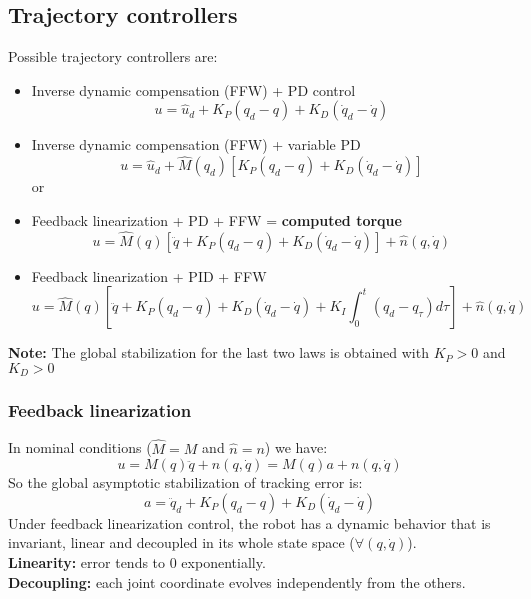 \documentclass[a4paper,12pt]{article}
\begin{document}
\subsection{Trajectory controllers}
Possible trajectory controllers are:
\begin{itemize}
    \item Inverse dynamic compensation (FFW) + PD control 
    \begin{equation}
        u = \hat{u}_d+ K_P(q_d-q)+K_D(\dot{q}_d-\dot{q})
    \end{equation}

    \item Inverse dynamic compensation (FFW) + variable PD
    \begin{equation}
        u = \hat{u}_d+ \hat{M}(q_d)[K_P(q_d-q)+K_D(\dot{q}_d-\dot{q})]
    \end{equation}
    or
    \item Feedback linearization + PD + FFW = \textbf{computed torque}
    \begin{equation}
        u = \hat{M}(q)[\ddot{q}+K_P(q_d-q)+K_D(\dot{q}_d-\dot{q})] + \hat{n}(q,\dot{q})
    \end{equation}

    \item Feedback linearization + PID + FFW
    \begin{equation}
        u = \hat{M}(q)[\ddot{q}+K_P(q_d-q)+K_D(\dot{q}_d-\dot{q})+K_I\int_0^t(q_d-q_\tau)d\tau] + \hat{n}(q,\dot{q})
    \end{equation}
\end{itemize}
\textbf{Note:} The global stabilization for the last two laws is obtained with
$K_P > 0$ and $K_D > 0 $

\subsubsection{Feedback linearization}
In nominal conditions ($\hat{M}=M$ and $\hat{n}=n$) we have:
\begin{equation}
    u = M(q)\ddot{q}+ n(q,\dot{q}) = M(q)a + n(q,\dot{q})
\end{equation}
So the global asymptotic stabilization of tracking error is:
\begin{equation}
    a = \ddot{q}_d + K_P(q_d-q) + K_D(\dot{q}_d-\dot{q})
\end{equation}
Under feedback linearization control, the robot 
has a dynamic behavior that is
invariant, linear and decoupled in its whole state space
($\forall(q,\dot{q})$).\\
\textbf{Linearity:} error tends to 0 exponentially.\\
\textbf{Decoupling:} each joint coordinate evolves independently
from the others.
\end{document}
